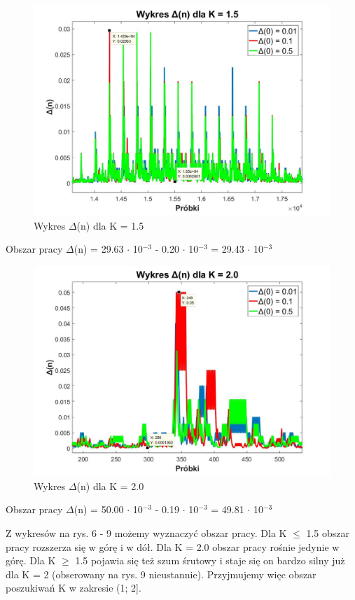 \documentclass[12pt, a4paper, oneside]{article}
\begin{document}
\clearpage
\begin{figure}[h]
\centering
\caption{Wykres $\Delta$(n) dla K = 1.5}
\includegraphics[scale=0.33]{f7.jpg}
\end{figure}
\begin{center}
Obszar pracy $\Delta$(n) = 29.63 $\cdot$ 10$^{-3}$ - 0.20 $\cdot$ 10$^{-3}$ = 29.43 $\cdot$ 10$^{-3}$
\end{center}
\begin{figure}[h]
\centering
\caption{Wykres $\Delta$(n) dla K = 2.0}
\includegraphics[scale=0.33]{f8.jpg}
\end{figure}
\begin{center}
Obszar pracy $\Delta$(n) = 50.00 $\cdot$ 10$^{-3}$ - 0.19 $\cdot$ 10$^{-3}$ = 49.81 $\cdot$ 10$^{-3}$
\end{center}
\indent\indent Z wykresów na rys. 6 - 9 możemy wyznaczyć obszar pracy. Dla K $\leq$ 1.5 obszar pracy rozszerza się w górę i w dół. Dla K = 2.0 obszar pracy rośnie jedynie w górę. Dla K $\geq$ 1.5 pojawia się też szum śrutowy i staje się on bardzo silny już dla K = 2 (obserowany na rys. 9 nieustannie). Przyjmujemy więc obszar poszukiwań K w zakresie (1; 2].
\clearpage
\end{document}
